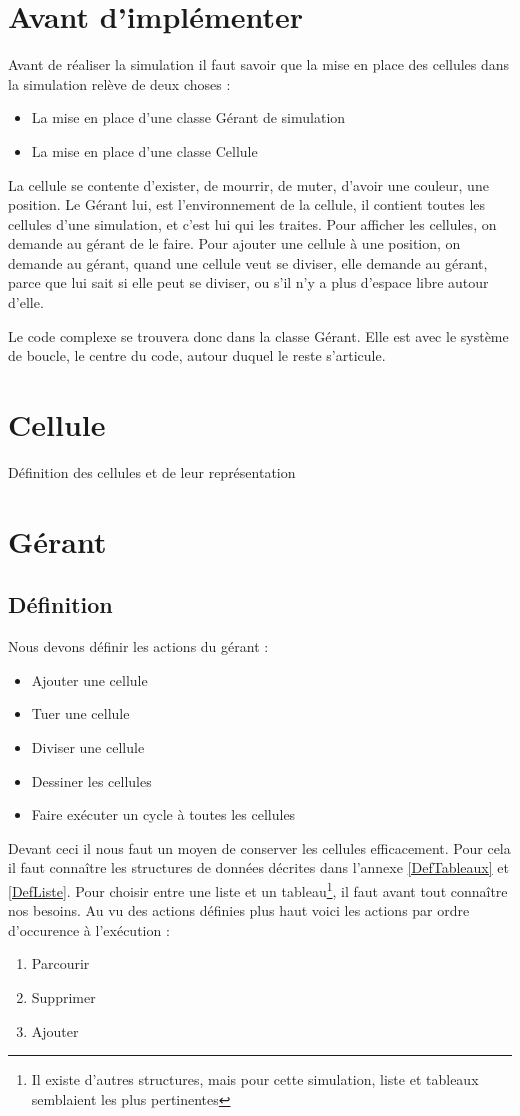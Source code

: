 \section{Avant d'implémenter}
Avant de réaliser la simulation il faut savoir que 
la mise en place des cellules dans la simulation relève de deux choses : 
\begin{itemize}
	\item La mise en place d'une classe Gérant de simulation
	\item La mise en place d'une classe Cellule
\end{itemize}

La cellule se contente d'exister, de mourrir, de muter, d'avoir une couleur, une position. Le Gérant lui, est l'environnement de la cellule, il contient toutes les cellules d'une simulation, et c'est lui qui les traites. Pour afficher les cellules, on demande au gérant de le faire. Pour ajouter une cellule à une position, on demande au gérant, quand une cellule veut se diviser, elle demande au gérant, parce que lui sait si elle peut se diviser, ou s'il n'y a plus d'espace libre autour d'elle.

Le code complexe se trouvera donc dans la classe Gérant. Elle est avec le système de boucle, le centre du code, autour duquel le reste s'articule.

\section{Cellule}
Définition des cellules et de leur représentation

\section{Gérant}
\subsection{Définition}
Nous devons définir les actions du gérant : 
\begin{itemize}
	\item Ajouter une cellule
	\item Tuer une cellule
	\item Diviser une cellule
	\item Dessiner les cellules
	\item Faire exécuter un cycle à toutes les cellules
\end{itemize}

Devant ceci il nous faut un moyen de conserver les cellules efficacement.
Pour cela il faut connaître les structures de données décrites dans l'annexe \ref{DefTableaux} et \ref{DefListe}. Pour choisir entre une liste et un tableau\footnote{Il existe d'autres structures, mais pour cette simulation, liste et tableaux semblaient les plus pertinentes}, il faut avant tout connaître nos besoins. Au vu des actions définies plus haut voici les actions par ordre d'occurence à l'exécution : 
\begin{enumerate}
	\item Parcourir 
	\item Supprimer
	\item Ajouter
\end{enumerate}

